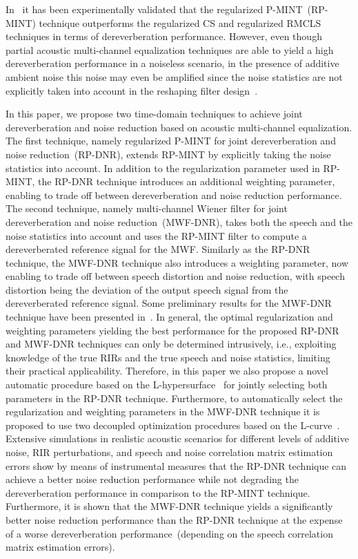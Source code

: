 \documentclass[draftcls,onecolumn,11pt]{IEEEtran}
\begin{document}
In~\cite{Kodrasi_ITASLP_2013} it has been experimentally validated that the regularized P-MINT~(RP-MINT) technique outperforms the regularized CS and regularized RMCLS techniques in terms of dereverberation performance.
However, even though partial acoustic multi-channel equalization techniques are able to yield a high dereverberation performance in a noiseless scenario, in the presence of additive ambient noise this noise may even be amplified since the noise statistics are not explicitly taken into account in the reshaping filter design~\cite{Kodrasi_ITASLP_2013,Thomas_WASPAA_2011}. 

In this paper, we propose two time-domain techniques to achieve joint dereverberation and noise reduction based on acoustic multi-channel equalization. 
The first technique, namely regularized P-MINT for joint dereverberation and noise reduction~(RP-DNR), extends RP-MINT by explicitly taking the noise statistics into account.
In addition to the regularization parameter used in RP-MINT, the RP-DNR technique introduces an additional weighting parameter, enabling to trade off between dereverberation and noise reduction performance. 
The second technique, namely multi-channel Wiener filter for joint dereverberation and noise reduction~(MWF-DNR), takes both the speech and the noise statistics into account and uses the RP-MINT filter to compute a dereverberated reference signal for the MWF.
Similarly as the RP-DNR technique, the MWF-DNR technique also introduces a weighting parameter, now enabling to trade off between speech distortion and noise reduction, with speech distortion being the deviation of the output speech signal from the dereverberated reference signal.
Some preliminary results for the MWF-DNR technique have been presented in~\cite{Kodrasi_IWAENC_2014}.
In general, the optimal regularization and weighting parameters yielding the best performance for the proposed RP-DNR and MWF-DNR techniques can only be determined intrusively, i.e., exploiting knowledge of the true RIRs and the true speech and noise statistics, limiting their practical applicability.
Therefore, in this paper we also propose a novel automatic procedure based on the L-hypersurface~\cite{Belge_SPIE_1998} for jointly selecting both parameters in the RP-DNR technique.
Furthermore, to automatically select the regularization and weighting parameters in the MWF-DNR technique it is proposed to use two decoupled optimization procedures based on the L-curve~\cite{Hansen_1993}.
Extensive simulations in realistic acoustic scenarios for different levels of additive noise, RIR perturbations, and speech and noise correlation matrix estimation errors show by means of instrumental measures that the RP-DNR technique can achieve a better noise reduction performance while not degrading the dereverberation performance in comparison to the RP-MINT technique.
Furthermore, it is shown that the MWF-DNR technique yields a significantly better noise reduction performance than the RP-DNR technique at the expense of a worse dereverberation performance~(depending on the speech correlation matrix estimation errors).
\end{document}
